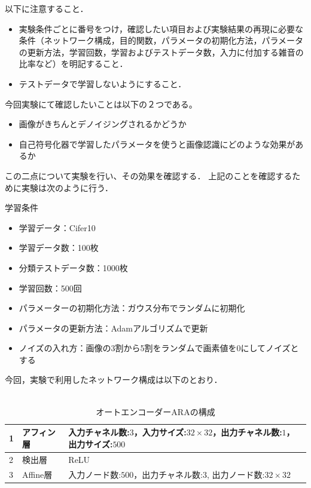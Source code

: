 \documentclass[12pt]{jsarticle}
\begin{document}
以下に注意すること．
\begin{itemize}
\item 実験条件ごとに番号をつけ，確認したい項目および実験結果の再現に必要な条件（ネットワーク構成，目的関数，パラメータの初期化方法，パラメータの更新方法，学習回数，学習およびテストデータ数，入力に付加する雑音の比率など）を明記すること．
\item テストデータで学習しないようにすること．
\end{itemize}

今回実験にて確認したいことは以下の２つである。

\begin{itemize}
  \item 画像がきちんとデノイジングされるかどうか
  \item 自己符号化器で学習したパラメータを使うと画像認識にどのような効果があるか
\end{itemize}

この二点について実験を行い、その効果を確認する．
上記のことを確認するために実験は次のように行う．

学習条件
\begin{itemize}
  \item 学習データ：Cifer10
  \item 学習データ数：100枚
  \item 分類テストデータ数：1000枚
  \item 学習回数：500回
  \item パラメーターの初期化方法：ガウス分布でランダムに初期化
  \item パラメータの更新方法：Adamアルゴリズムで更新
  \item ノイズの入れ方：画像の3割から5割をランダムで画素値を0にしてノイズとする
\end{itemize}


今回，実験で利用したネットワーク構成は以下のとおり．\\\\
\begin{table}[bt]
\begin{center}
\caption{オートエンコーダーARAの構成}
\label{table:AE:ARA}
\begin{tabularx}{0.9\linewidth}{|l|l|X|}
\hline
1 & アフィン層 & 入力チャネル数:$3$，入力サイズ:$32 \times 32$，出力チャネル数:$1$，出力サイズ:$500 $ \\
\hline
2 & 検出層 & ReLU \\
\hline
3 & Affine層 & 入力ノード数:$500$，出力チャネル数:$3$, 出力ノード数:$ 32 \times 32 $ \\
\hline
\end{tabularx}
\end{center}
\end{table}
\end{document}

